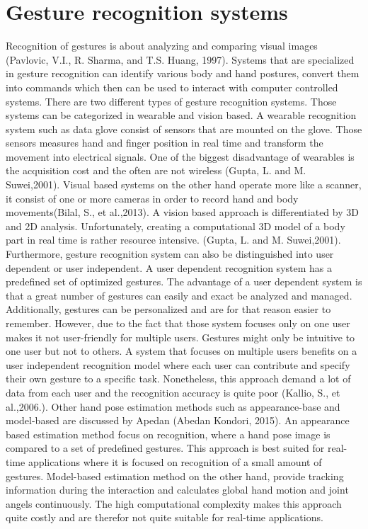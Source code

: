 


\section{Gesture recognition systems}
\label{sec:handfreesensor}
Recognition of gestures is about analyzing and comparing visual images (Pavlovic, V.I., R. Sharma, and T.S. Huang, 1997). Systems that are specialized in gesture recognition can identify various body and hand postures, convert them into commands which then can be used to interact with computer controlled systems.
There are two different types of gesture recognition systems. Those systems can be categorized in wearable and vision based. A wearable recognition system such as data glove consist of sensors that are mounted on the glove. Those sensors measures hand and finger position in real time and transform the movement into electrical signals. One of the biggest disadvantage of wearables is the acquisition cost and the often are not wireless (Gupta, L. and M. Suwei,2001). Visual based systems on the other hand operate more like a scanner, it consist of one or more cameras in order to record hand and body movements(Bilal, S., et al.,2013). A vision based approach is differentiated by 3D and 2D analysis. Unfortunately, creating a computational 3D model of a body part in real time is rather resource intensive. (Gupta, L. and M. Suwei,2001). Furthermore, gesture recognition system can also be distinguished into user dependent or user independent. A user dependent recognition system has a predefined set of optimized gestures. The advantage of a user dependent system is that a great number of gestures can easily and exact be analyzed and managed. Additionally, gestures can be personalized and are for that reason easier to remember. However, due to the fact that those system focuses only on one user makes it not user-friendly for multiple users. 
Gestures might only be intuitive to one user but not to others. A system that focuses on multiple users benefits on a user independent recognition model where each user can contribute and specify their own gesture to a specific task. Nonetheless, this approach demand a lot of data from each user and the recognition accuracy is quite poor (Kallio, S., et al.,2006.).
Other hand pose estimation methods such as  appearance-base and model-based are discussed by Apedan (Abedan Kondori, 2015). An appearance based estimation method focus on recognition, where a hand pose image is compared to a set of predefined gestures. This approach is best suited for real-time applications where it is focused on recognition of a small amount of gestures. Model-based estimation method on the other hand, provide tracking information during the interaction and calculates global hand motion and joint angels continuously. The high computational complexity makes this approach quite costly and are therefor not quite suitable for real-time applications.


